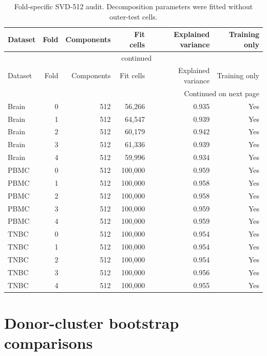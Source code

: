{\footnotesize\setlength{\tabcolsep}{3pt}
\begin{longtable}{lrrrrr}
\caption{Fold-specific SVD-512 audit. Decomposition parameters were fitted without outer-test cells.}\label{tab:s-svd}\\
\toprule
Dataset & Fold & Components & Fit cells & Explained variance & Training only \\
\midrule
\endfirsthead
\multicolumn{6}{c}{\tablename\ \thetable{} continued}\\
\toprule
Dataset & Fold & Components & Fit cells & Explained variance & Training only \\
\midrule
\endhead
\midrule
\multicolumn{6}{r}{Continued on next page}\\
\endfoot
\bottomrule
\endlastfoot
Brain & 0 & 512 & 56,266 & 0.935 & Yes \\
Brain & 1 & 512 & 64,547 & 0.939 & Yes \\
Brain & 2 & 512 & 60,179 & 0.942 & Yes \\
Brain & 3 & 512 & 61,336 & 0.939 & Yes \\
Brain & 4 & 512 & 59,996 & 0.934 & Yes \\
PBMC & 0 & 512 & 100,000 & 0.959 & Yes \\
PBMC & 1 & 512 & 100,000 & 0.958 & Yes \\
PBMC & 2 & 512 & 100,000 & 0.958 & Yes \\
PBMC & 3 & 512 & 100,000 & 0.959 & Yes \\
PBMC & 4 & 512 & 100,000 & 0.959 & Yes \\
TNBC & 0 & 512 & 100,000 & 0.954 & Yes \\
TNBC & 1 & 512 & 100,000 & 0.954 & Yes \\
TNBC & 2 & 512 & 100,000 & 0.954 & Yes \\
TNBC & 3 & 512 & 100,000 & 0.956 & Yes \\
TNBC & 4 & 512 & 100,000 & 0.955 & Yes \\
\end{longtable}
}

\clearpage\section{Donor-cluster bootstrap comparisons}

